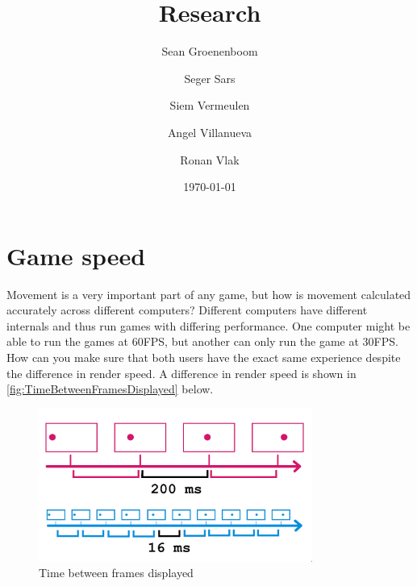 \documentclass{article} %
\title{Research} %
\author{Sean Groenenboom \and Seger Sars \and Siem Vermeulen \and Angel Villanueva \and Ronan Vlak} %
\date{\today} %
\begin{document}
\maketitle %
\newpage

\tableofcontents %
\newpage

\section{Game speed}
Movement is a very important part of any game, but how is movement calculated accurately across different computers?
Different computers have different internals and thus run games with differing performance.
One computer might be able to run the games at 60FPS, but another can only run the game at 30FPS.
How can you make sure that both users have the exact same experience despite the difference in render speed.
A difference in render speed is shown in \autoref{fig:TimeBetweenFramesDisplayed} below.
\begin{figure}[h!]
	\centering
	\includegraphics[width=0.8\textwidth]{time_between_frames.png}
	\caption{Time between frames displayed}
	\label{fig:TimeBetweenFramesDisplayed}
\end{figure}
\end{document}
